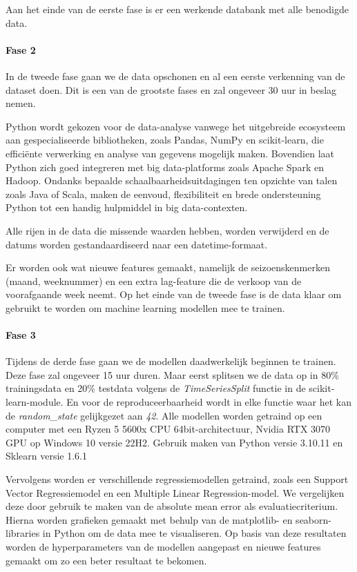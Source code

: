 \documentclass{hogent-article}
\begin{document}
    Aan het einde van de eerste fase is er een werkende databank met alle benodigde data.
    
    \paragraph{Fase 2}
    
    In de tweede fase gaan we de data opschonen en al een eerste verkenning van de dataset doen. Dit is een van de grootste fases en zal ongeveer 30 uur in beslag nemen.
    
    Python wordt gekozen voor de data-analyse vanwege het uitgebreide ecosysteem aan gespecialiseerde bibliotheken, zoals Pandas, NumPy en scikit-learn, die efficiënte verwerking en analyse van gegevens mogelijk maken. Bovendien laat Python zich goed integreren met big data-platforms zoals Apache Spark en Hadoop. Ondanks bepaalde schaalbaarheidsuitdagingen ten opzichte van talen zoals Java of Scala, maken de eenvoud, flexibiliteit en brede ondersteuning Python tot een handig hulpmiddel in big data-contexten\autocite{Kabir2024}.
    
    Alle rijen in de data die missende waarden hebben, worden verwijderd en de datums worden gestandaardiseerd naar een datetime-formaat.
    
    Er worden ook wat nieuwe features gemaakt, namelijk de seizoenskenmerken (maand, weeknummer) en een extra lag-feature die de verkoop van de voorafgaande week neemt. Op het einde van de tweede fase is de data klaar om gebruikt te worden om machine learning modellen mee te trainen.
    
    \paragraph{Fase 3}
    
    Tijdens de derde fase gaan we de modellen daadwerkelijk beginnen te trainen. Deze fase zal ongeveer 15 uur duren. Maar eerst splitsen we de data op in 80\% trainingsdata en 20\% testdata volgens de \emph{TimeSeriesSplit} functie in de scikit-learn-module. En voor de reproduceerbaarheid wordt in elke functie waar het kan de \emph{random\_state} gelijkgezet aan \emph{42}. Alle modellen worden getraind op een computer met een Ryzen 5 5600x CPU 64bit-architectuur, Nvidia RTX 3070 GPU op Windows 10 versie 22H2. Gebruik maken van Python versie 3.10.11 en Sklearn versie 1.6.1
    
    Vervolgens worden er verschillende regressiemodellen getraind, zoals een Support Vector Regressiemodel en een Multiple Linear Regression-model. We vergelijken deze door gebruik te maken van de absolute mean error als evaluatiecriterium. Hierna worden grafieken gemaakt met behulp van de matplotlib- en seaborn-libraries in Python om de data mee te visualiseren. Op basis van deze resultaten worden de hyperparameters van de modellen aangepast en nieuwe features gemaakt om zo een beter resultaat te bekomen.
    
\end{document}
